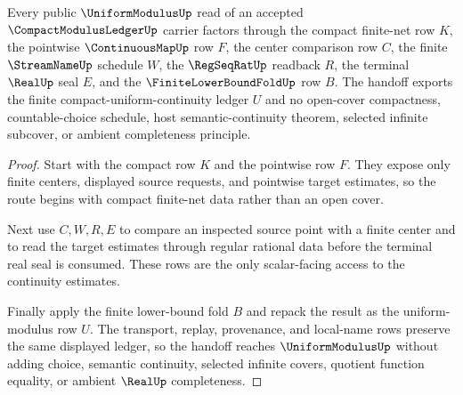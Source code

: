 \begin{theorem}
\label{thm:compact-modulus-ledger-uniform-handoff}
Every public $\UniformModulusUp$ read of an accepted $\CompactModulusLedgerUp$ carrier factors through the compact finite-net row $K$, the pointwise $\ContinuousMapUp$ row $F$, the center comparison row $C$, the finite $\StreamNameUp$ schedule $W$, the $\RegSeqRatUp$ readback $R$, the terminal $\RealUp$ seal $E$, and the $\FiniteLowerBoundFoldUp$ row $B$. The handoff exports the finite compact-uniform-continuity ledger $U$ and no open-cover compactness, countable-choice schedule, host semantic-continuity theorem, selected infinite subcover, or ambient completeness principle.
\end{theorem}
\begin{proof}
Start with the compact row $K$ and the pointwise row $F$. They expose only finite centers, displayed source requests, and pointwise target estimates, so the route begins with compact finite-net data rather than an open cover.

Next use $C,W,R,E$ to compare an inspected source point with a finite center and to read the target estimates through regular rational data before the terminal real seal is consumed. These rows are the only scalar-facing access to the continuity estimates.

Finally apply the finite lower-bound fold $B$ and repack the result as the uniform-modulus row $U$. The transport, replay, provenance, and local-name rows preserve the same displayed ledger, so the handoff reaches $\UniformModulusUp$ without adding choice, semantic continuity, selected infinite covers, quotient function equality, or ambient $\RealUp$ completeness.
\end{proof}


\begin{closurestatus}{\CompactModulusLedgerUp}
  \theoryclosure{\seedClosure}
  \formalstatus{\unformalizedV}
\end{closurestatus}
